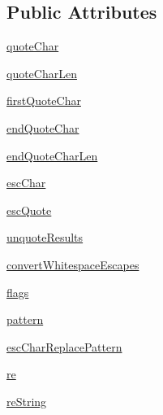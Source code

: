 \subsection*{Public Attributes}
\begin{DoxyCompactItemize}
\item 
\hyperlink{classsetuptools_1_1__vendor_1_1pyparsing_1_1QuotedString_a9db4e52dd3def3b42d442c4dc624f6bf}{quote\+Char}
\item 
\hyperlink{classsetuptools_1_1__vendor_1_1pyparsing_1_1QuotedString_a4b0ad94e96b3517efff45ddf30aa9428}{quote\+Char\+Len}
\item 
\hyperlink{classsetuptools_1_1__vendor_1_1pyparsing_1_1QuotedString_ae83fc0162df15720721621bb0f6c0363}{first\+Quote\+Char}
\item 
\hyperlink{classsetuptools_1_1__vendor_1_1pyparsing_1_1QuotedString_a18247699f0fd6166878ee2c05d3ddbdc}{end\+Quote\+Char}
\item 
\hyperlink{classsetuptools_1_1__vendor_1_1pyparsing_1_1QuotedString_a9f610dc3b51cea47eef877d2214f48cd}{end\+Quote\+Char\+Len}
\item 
\hyperlink{classsetuptools_1_1__vendor_1_1pyparsing_1_1QuotedString_a49080976d30eb0a5cfbd04a628912829}{esc\+Char}
\item 
\hyperlink{classsetuptools_1_1__vendor_1_1pyparsing_1_1QuotedString_a338d058ebe40692eb9fe2498eab158ce}{esc\+Quote}
\item 
\hyperlink{classsetuptools_1_1__vendor_1_1pyparsing_1_1QuotedString_a2998d30ad7391f35ffc9c5bfc32a6a3b}{unquote\+Results}
\item 
\hyperlink{classsetuptools_1_1__vendor_1_1pyparsing_1_1QuotedString_a9f80fe86f0b37ce2b871a57c7edebb6c}{convert\+Whitespace\+Escapes}
\item 
\hyperlink{classsetuptools_1_1__vendor_1_1pyparsing_1_1QuotedString_adcd0ae08960bd1dc9ffcc960a9622f30}{flags}
\item 
\hyperlink{classsetuptools_1_1__vendor_1_1pyparsing_1_1QuotedString_adcd6f20ad42bea7dbe43c6327405d152}{pattern}
\item 
\hyperlink{classsetuptools_1_1__vendor_1_1pyparsing_1_1QuotedString_a7657aab779e4cacd296eecdfbaab2467}{esc\+Char\+Replace\+Pattern}
\item 
\hyperlink{classsetuptools_1_1__vendor_1_1pyparsing_1_1QuotedString_a06bb72f417ae9c19815d4de973c579e4}{re}
\item 
\hyperlink{classsetuptools_1_1__vendor_1_1pyparsing_1_1QuotedString_a792ee2c7bdbec069f15656bd024d7d17}{re\+String}
\item 

\end{DoxyCompactItemize}
